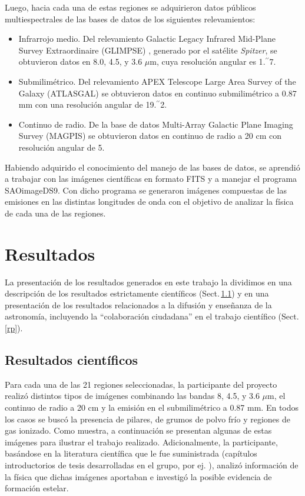\documentclass[baaa]{baaa}
\begin{document}
Luego, hacia cada una de estas regiones se adquirieron datos públicos multiespectrales de las bases de datos de los siguientes relevamientos: 

\begin{itemize}
\item Infrarrojo medio. Del relevamiento Galactic Legacy Infrared Mid-Plane Survey Extraordinaire (GLIMPSE) \citep{benjamin2003}, generado por el satélite {\it Spitzer}, se obtuvieron datos en  8.0, 4.5, y 3.6 \(\mu\)m, cuya resolución angular es 1$.\!\!^{\prime\prime}$7.

\item Submilimétrico. Del relevamiento APEX Telescope Large Area Survey of the Galaxy  (ATLASGAL) \citep{schuller2009} se obtuvieron datos en continuo submilimétrico a 0.87 mm con una resolución angular de 19$.\!\!^{\prime\prime}$2.

\item Continuo de radio. De la base de datos Multi-Array Galactic Plane Imaging Survey (MAGPIS) \citep{helfand2006} se obtuvieron datos en continuo de radio a 20 cm con resolución angular de 5\arcsec.
\end{itemize}

Habiendo adquirido el conocimiento del manejo de las bases de datos, se aprendió a trabajar con las imágenes científicas en formato FITS y a manejar el programa SAOimageDS9. Con dicho programa se generaron imágenes compuestas de las emisiones en las distintas longitudes de onda con el objetivo de analizar la física de cada una de las regiones.



\section{Resultados}

La presentación de los resultados generados en este trabajo la dividimos en una descripción de los resultados estrictamente científicos (Sect.\,\ref{rc}) y en una presentación de los resultados relacionados a la difusión y enseñanza de la astronomía, incluyendo la ``colaboración ciudadana'' en el trabajo científico (Sect.\,\ref{rp}).

\subsection{Resultados científicos}
\label{rc}

Para cada una de las 21 regiones seleccionadas, la participante del proyecto realizó distintos tipos de imágenes combinando las bandas 8, 4.5, y 3.6 $\mu$m, el continuo de radio a 20 cm y la emisión en el submilimétrico a 0.87 mm. En todos los casos se buscó la presencia de pilares, de grumos de polvo frío y regiones de gas ionizado. Como muestra, a continuación se presentan algunas de estas imágenes para ilustrar el trabajo realizado. Adicionalmente, la participante, basándose en la literatura científica que le fue suministrada (capítulos introductorios de tesis desarrolladas en el grupo, por ej. \citealt{mariela,belen}), analizó  información  de la física que dichas imágenes aportaban e investigó la posible evidencia de formación estelar.
\end{document}
